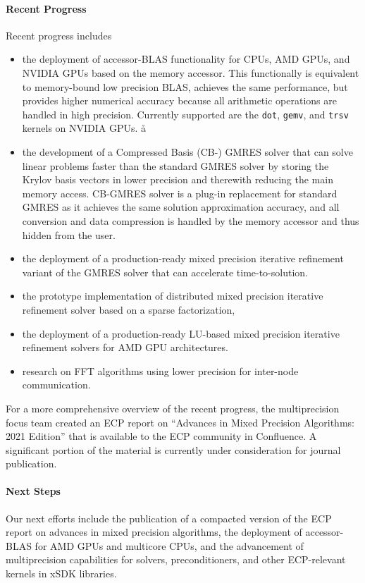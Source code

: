 \paragraph{Recent Progress}
Recent progress includes
\begin{itemize}
\item the deployment of accessor-BLAS functionality for CPUs, AMD GPUs, and NVIDIA GPUs based on the memory accessor. This functionally is equivalent to memory-bound low precision BLAS, achieves the same performance, but provides higher numerical accuracy because all arithmetic operations are handled in high precision. Currently supported are the \texttt{dot}, \texttt{gemv}, and \texttt{trsv} kernels on NVIDIA GPUs. å
\item the development of a Compressed Basis (CB-) GMRES solver that can solve linear problems faster than the standard GMRES solver by storing the Krylov basis vectors in lower precision and therewith reducing the main memory access. CB-GMRES solver is a plug-in replacement for standard GMRES as it achieves the same solution approximation accuracy, and all conversion and data compression is handled by the memory accessor and thus hidden from the user.
\item the deployment of a production-ready mixed precision iterative refinement variant of the GMRES solver that can accelerate time-to-solution.
\item the prototype implementation of distributed mixed precision iterative refinement solver based on a sparse factorization,
\item the deployment of a production-ready LU-based mixed precision iterative refinement solvers for AMD GPU architectures.
\item research on FFT algorithms using lower precision for inter-node communication. 
\end{itemize}


For a more comprehensive overview of the recent progress, the multiprecision focus team created an ECP report on ``Advances in Mixed Precision Algorithms: 2021 Edition'' that is available to the ECP community in Confluence. A significant portion of the material is currently under consideration for journal publication.


\paragraph{Next Steps}

Our next efforts include the publication of a compacted version of the ECP report on advances in mixed precision algorithms, the deployment of accessor-BLAS for AMD GPUs and multicore CPUs,  and the advancement of multiprecision capabilities for solvers, preconditioners, and other ECP-relevant kernels in xSDK libraries.

